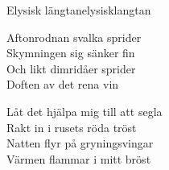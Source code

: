 \begin{song}{Elysisk längtan}{elysisklangtan}
\begin{vers}
Aftonrodnan svalka sprider\\
Skymningen sig sänker fin\\
Och likt dimridåer sprider\\
Doften av det rena vin\\
\end{vers}
\begin{vers}
\repopen Låt det hjälpa mig till att segla\\
Rakt in i rusets röda tröst\\
Natten flyr på gryningsvingar\\
Värmen flammar i mitt bröst \repclose\\
\end{vers}
\end{song}
